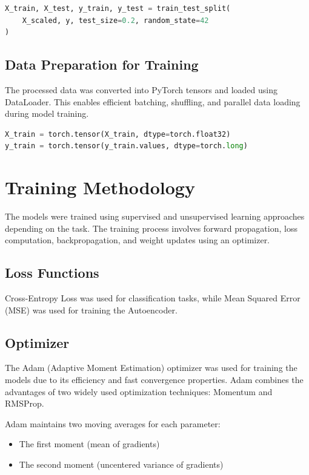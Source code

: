\documentclass{ecsproject}     %
\begin{document}
\begin{lstlisting}[language=Python, caption=Train-Test Split]
X_train, X_test, y_train, y_test = train_test_split(
    X_scaled, y, test_size=0.2, random_state=42
)
\end{lstlisting}

\subsection{Data Preparation for Training}

The processed data was converted into PyTorch tensors and loaded using DataLoader. This enables efficient batching, shuffling, and parallel data loading during model training.
\begin{lstlisting}[language=Python, caption=Conversion to PyTorch Tensors]
X_train = torch.tensor(X_train, dtype=torch.float32)
y_train = torch.tensor(y_train.values, dtype=torch.long)
\end{lstlisting}

\section{Training Methodology}
The models were trained using supervised and unsupervised learning approaches depending on the task. The training process involves forward propagation, loss computation, backpropagation, and weight updates using an optimizer.

\subsection{Loss Functions}
 Cross-Entropy Loss was used for classification tasks, while Mean Squared Error (MSE) was used for training the Autoencoder.

\subsection{Optimizer}

The Adam (Adaptive Moment Estimation) optimizer was used for training the models due to its efficiency and fast convergence properties. Adam combines the advantages of two widely used optimization techniques: Momentum and RMSProp.

Adam maintains two moving averages for each parameter:

\begin{itemize}
    \item The first moment (mean of gradients)
    \item The second moment (uncentered variance of gradients)
\end{itemize}
\end{document}

